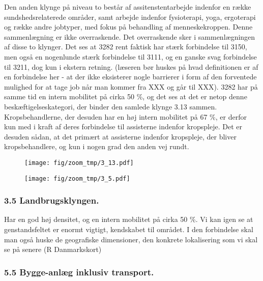Den anden klynge på niveau to består af assitenstentarbejde indenfor en række sundshedsrelaterede områder, samt arbejde indenfor fysioterapi, yoga, ergoterapi og række andre jobtyper, med fokus på behandling af menneskekroppen. Denne sammenlægning er ikke overraskende. Det overraskende sker i sammenlægningen af disse to klynger. Det ses at 3282 rent faktisk har stærk forbindelse til 3150, men også en nogenlunde stærk forbindelse til 3111, og en ganske svag forbindelse til 3211, dog kun i ekstern retning. (læseren bør huskes på hvad definitionen er af en forbindelse her - at der ikke eksisterer nogle barrierer i form af den forventede mulighed for at tage job når man kommer fra XXX og går til XXX). 3282 har på samme tid en intern mobilitet på cirka 50 \%, og det ses at det er netop denne beskæftigelseskategori, der binder den samlede klynge 3.13 sammen. Kropsbehandlerne, der desuden har en høj intern mobilitet på 67 \%,  er derfor kun med i kraft af deres forbindelse til assisterne indenfor kropspleje.  Det er desuden sådan, at det primært at assisterne indenfor kropspleje, der bliver kropsbehandlere, og kun i nogen grad den anden vej rundt.  

%
\begin{figure} \label{monecaeksempel1}
\parbox[H]{6cm}{\null
	\texttt{[image: fig/zoom\_tmp/3\_13.pdf]}
}
\parbox[H]{14cm}{\null
	\texttt{[image: fig/zoom\_tmp/3\_5.pdf]}
}
\end{figure}
%

\subsubsection{3.5 Landbrugsklyngen.}

Har en god høj densitet, og en intern mobilitet på cirka 50 \%.  Vi kan igen se at genstandsfeltet er enormt vigtigt, kendskabet til området. I den forbindelse skal man også huske de geografiske dimensioner, den konkrete lokalisering som vi skal se på senere (R Danmarkskort)


\subsubsection{5.5 Bygge-anlæg inklusiv transport.}

